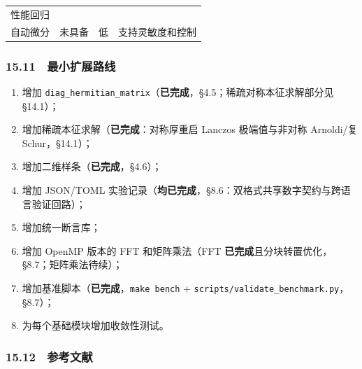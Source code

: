 \documentclass[
]{ctexbook}
\providecommand{\tightlist}{%
  \setlength{\itemsep}{0pt}\setlength{\parskip}{0pt}}
\begin{document}
\begin{longtable}[]{@{}llll@{}}
\begin{minipage}[t]{0.22\columnwidth}
性能回归\strut
\end{minipage}\tabularnewline
\begin{minipage}[t]{0.22\columnwidth}\raggedright
自动微分\strut
\end{minipage} & \begin{minipage}[t]{0.22\columnwidth}\raggedright
未具备\strut
\end{minipage} & \begin{minipage}[t]{0.22\columnwidth}\raggedright
低\strut
\end{minipage} & \begin{minipage}[t]{0.22\columnwidth}\raggedright
支持灵敏度和控制\strut
\end{minipage}\tabularnewline
\bottomrule
\end{longtable}

\hypertarget{ux6700ux5c0fux6269ux5c55ux8defux7ebf}{%
\subsubsection{15.11　最小扩展路线}\label{ux6700ux5c0fux6269ux5c55ux8defux7ebf}}

\begin{enumerate}
\def\labelenumi{\arabic{enumi}.}
\tightlist
\item
  增加
  \texttt{diag\_hermitian\_matrix}（\textbf{已完成}，§4.5；稀疏对称本征求解部分见
  §14.1）；
\item
  增加稀疏本征求解（\textbf{已完成}：对称厚重启 Lanczos 极端值与非对称
  Arnoldi/复 Schur，§14.1）；
\item
  增加二维样条（\textbf{已完成}，§4.6）；
\item
  增加 JSON/TOML
  实验记录（\textbf{均已完成}，§8.6：双格式共享数字契约与跨语言验证回路）；
\item
  增加统一断言库；
\item
  增加 OpenMP 版本的 FFT 和矩阵乘法（FFT
  \textbf{已完成}且分块转置优化，§8.7；矩阵乘法待续）；
\item
  增加基准脚本（\textbf{已完成}，\texttt{make\ bench} +
  \texttt{scripts/validate\_benchmark.py}，§8.7）；
\item
  为每个基础模块增加收敛性测试。
\end{enumerate}

\hypertarget{ux53c2ux8003ux6587ux732e-6}{%
\subsubsection{15.12　参考文献}\label{ux53c2ux8003ux6587ux732e-6}}
\end{document}
